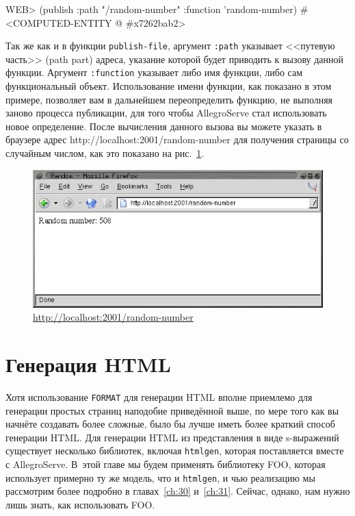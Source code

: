 \begin{myverb}
WEB> (publish :path "/random-number" :function 'random-number)
#<COMPUTED-ENTITY @ #x7262bab2>
\end{myverb}

Так же как и в функции \lstinline{publish-file}, аргумент \lstinline{:path} указывает <<путевую
часть>> (path part) адреса, указание которой будет приводить к вызову данной функции.
Аргумент \lstinline{:function} указывает либо имя функции, либо сам функциональный объект.
Использование имени функции, как показано в этом примере, позволяет вам в дальнейшем
переопределить функцию, не выполняя заново процесса публикации, для того чтобы AllegroServe
стал использовать новое определение. После вычисления данного вызова вы можете указать в
браузере адрес http://localhost:2001/random-number для получения страницы со случайным
числом, как это показано на рис.~\ref{fig:26-3}.

\begin{figure}[htb]
  \centering
  \includegraphics[scale=0.7]{images/random-number.jpg}
  \caption{\url{http://localhost:2001/random-number}}
  \label{fig:26-3}
\end{figure}

\section{Генерация HTML}

Хотя использование \lstinline{FORMAT} для генерации HTML вполне приемлемо для
генерации простых страниц наподобие приведённой выше, по мере того как вы начнёте
создавать более сложные, было бы лучше иметь более краткий способ генерации HTML. Для
генерации HTML из представления в виде s-выражений существует несколько библиотек,
включая \lstinline{htmlgen}, которая поставляется вместе с AllegroServe. В~этой главе мы будем
применять библиотеку FOO, которая использует примерно ту же модель, что и
\texttt{htmlgen}, и чью реализацию мы рассмотрим более подробно в главах~\ref{ch:30}
и~\ref{ch:31}. Сейчас, однако, нам нужно лишь знать, как использовать FOO.

